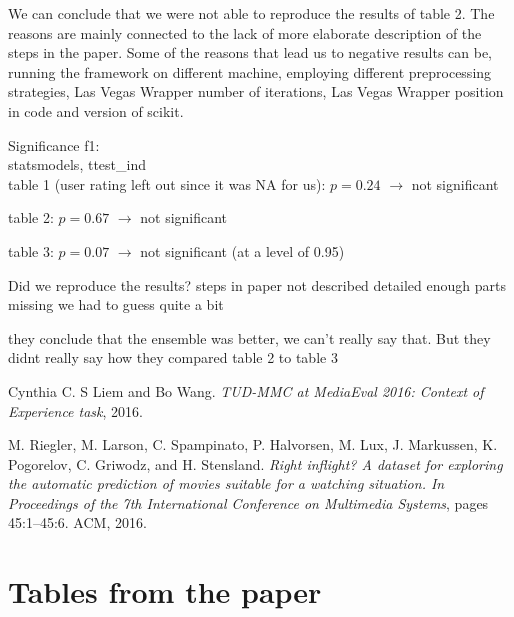\documentclass[sigconf]{acmart}
\begin{document}
We can conclude that we were not able to reproduce the results of table 2. The reasons are mainly connected to the lack of more elaborate description of the steps in the paper. Some of the reasons that lead us to negative results can be, running the framework on different machine, employing different preprocessing strategies, Las Vegas Wrapper number of iterations, Las Vegas Wrapper position in code and version of scikit.




Significance f1: \\
statsmodels, ttest\_ind \\

table 1 (user rating left out since it was NA for us): $p = 0.24$
$\rightarrow$ not significant

table 2: $p = 0.67$
$\rightarrow$ not significant

table 3: $p = 0.07$
$\rightarrow$ not significant (at a level of 0.95)


Did we reproduce the results?
steps in paper not described detailed enough
parts missing
we had to guess quite a bit

they conclude that the ensemble was better, we can't really say that. But they didnt really say how they compared table 2 to table 3





\begin{thebibliography}{2}

   Cynthia C. S Liem and Bo Wang. \textit{TUD-MMC at MediaEval 2016: Context of Experience task}, 2016.

   M. Riegler, M. Larson, C. Spampinato, P. Halvorsen, M. Lux, J. Markussen, K. Pogorelov, C. Griwodz, and H. Stensland. \textit{Right inflight? A dataset for exploring the automatic prediction of movies suitable for a watching situation. In Proceedings of the 7th International Conference on Multimedia Systems}, pages 45:1–45:6. ACM, 2016.

\end{thebibliography}

\newpage
\clearpage
\newpage
\appendix

\section{Tables from the paper}
\end{document}
